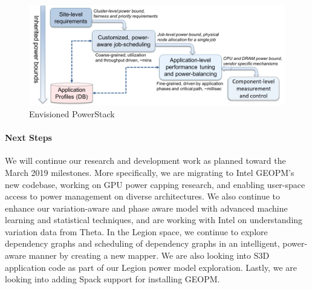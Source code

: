 \begin{figure}[t]
	\centering
	\includegraphics[scale = 0.7]{projects/2.3.1-PMR/2.3.1.12-Power-Steering/PowerStack_v2.png}
	\caption{Envisioned PowerStack}
	\label{fig:pstack}
\end{figure}

\paragraph{Next Steps}
We will continue our research and development work as planned toward the March 2019 milestones. More specifically, we are migrating to Intel GEOPM's new codebase, working on GPU power capping research, and enabling user-space access to power management on diverse architectures. We also continue to enhance our variation-aware and phase aware model with advanced machine learning and statistical techniques, and are working with Intel on understanding variation data from Theta. In the Legion space, we continue to explore dependency graphs and scheduling of dependency graphs in an intelligent, power-aware manner by creating a new mapper. We are also looking into S3D application code as part of our Legion power model  exploration. Lastly, we are looking into adding Spack support for installing GEOPM. 

